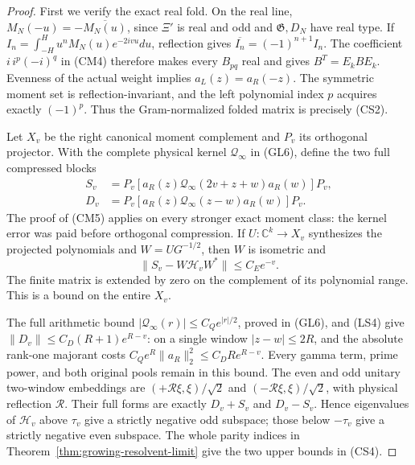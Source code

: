 \documentclass[11pt]{article}
\theoremstyle{remark}\newtheorem{remark}[theorem]{Remark}
\begin{document}
\begin{proof}
First we verify the exact real fold. On the real line,
\(M_N(-u)=-\overline{M_N(u)}\), since \(\Xi'\) is real and odd
and \(\mathfrak G,D_N\) have real type. If
\(I_n=\int_{-H}^H u^nM_N(u)e^{-2ivu}du\), reflection gives
\(\overline{I_n}=(-1)^{n+1}I_n\).
The coefficient \(i\,i^p(-i)^q\) in (CM4) therefore makes
every \(B_{pq}\) real and gives \(B^T=E_kBE_k\).
Evenness of the actual weight implies \(a_L(z)=a_R(-z)\).
The symmetric moment set is reflection-invariant, and the
left polynomial index \(p\) acquires exactly \((-1)^p\).
Thus the Gram-normalized folded matrix is precisely (CS2).

Let \(X_v\) be the right canonical moment complement and \(P_v\)
its orthogonal projector. With the complete physical kernel
\(\mathcal Q_\infty\) in (GL6), define the two full compressed blocks
\[
 \begin{split}
 S_v&=P_v[a_R(z)\mathcal Q_\infty(2v+z+w)a_R(w)]P_v,\\
 D_v&=P_v[a_R(z)\mathcal Q_\infty(z-w)a_R(w)]P_v.
 \end{split}                                                   \tag{CS5}
\]
The proof of (CM5) applies on every stronger exact moment class:
the kernel error was paid before orthogonal compression. If
\(U:\mathbb C^k\to X_v\) synthesizes the projected polynomials
and \(W=UG^{-1/2}\), then \(W\) is isometric and
\[
 \|S_v-W\mathcal H_vW^*\|\le C_Ee^{-v}.              \tag{CS6}
\]
The finite matrix is extended by zero on the complement of its
polynomial range. This is a bound on the entire \(X_v\).

The full arithmetic bound
\(|\mathcal Q_\infty(r)|\le C_Qe^{|r|/2}\), proved in (GL6),
and (LS4) give
\(\|D_v\|\le C_D(R+1)e^{R-v}\): on a single window
\(|z-w|\le2R\), and the absolute rank-one majorant costs
\(C_Qe^R\|a_R\|_2^2\le C_DRe^{R-v}\).
Every gamma term, prime power, and both original pools remain
in this bound. The even and odd unitary two-window embeddings
are \((+\mathcal R\xi,\xi)/\sqrt2\) and
\((-\mathcal R\xi,\xi)/\sqrt2\), with physical reflection
\(\mathcal R\). Their full forms are exactly \(D_v+S_v\) and
\(D_v-S_v\). Hence eigenvalues of \(\mathcal H_v\) above
\(\tau_v\) give a strictly negative odd subspace; those below
\(-\tau_v\) give a strictly negative even subspace.
The whole parity indices in Theorem~\ref{thm:growing-resolvent-limit}
give the two upper bounds in (CS4).


\end{proof}
\end{document}
